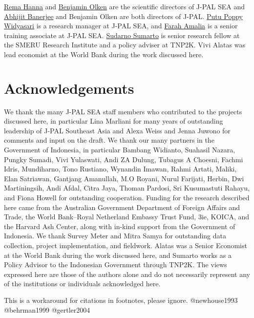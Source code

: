 \href{https://www.hks.harvard.edu/faculty/rema-hanna}{Rema Hanna} and \href{https://economics.mit.edu/faculty/bolken}{Benjamin Olken} are the scientific directors of J-PAL SEA and \href{https://economics.mit.edu/faculty/banerjee}{Abhijit Banerjee} and Benjamin Olken are both directors of J-PAL. \href{https://www.povertyactionlab.org/person/widyasari}{Putu Poppy Widyasari} is a research manager at J-PAL SEA, and \href{https://www.povertyactionlab.org/person/amalia}{Farah Amalia} is a senior training associate at J-PAL SEA. \href{https://www.smeru.or.id/en/content/sudarno-sumarto}{Sudarno Sumarto} is senior research fellow at the SMERU Research Institute and a policy adviser at TNP2K. Vivi Alatas was lead economist at the World Bank during the work discussed here.

\hypertarget{acknowledgements-4}{%
\section*{Acknowledgements}\label{acknowledgements-4}}

We thank the many J-PAL SEA staff members who contributed to the projects discussed here, in particular Lina Marliani for many years of outstanding leadership of J-PAL Southeast Asia and Alexa Weiss and Jenna Juwono for comments and input on the draft. We thank our many partners in the Government of Indonesia, in particular Bambang Widianto, Suahasil Nazara, Pungky Sumadi, Vivi Yulaswati, Andi ZA Dulung, Tubagus A Choesni, Fachmi Idris, Mundiharno, Tono Rustiano, Wynandin Imawan, Rahmi Artati, Maliki, Elan Satriawan, Gantjang Amanullah, M.O Royani, Nurul Farijati, Herbin, Dwi Martiningsih, Andi Afdal, Citra Jaya, Thoman Pardosi, Sri Kusumastuti Rahayu, and Fiona Howell for outstanding cooperation. Funding for the research described here came from the Australian Government Department of Foreign Affairs and Trade, the World Bank--Royal Netherland Embassy Trust Fund, 3ie, KOICA, and the Harvard Ash Center, along with in-kind support from the Government of Indonesia. We thank Survey Meter and Mitra Samya for outstanding data collection, project implementation, and fieldwork. Alatas was a Senior Economist at the World Bank during the work discussed here, and Sumarto works as a Policy Advisor to the Indonesian Government through TNP2K. The views expressed here are those of the authors alone and do not necessarily represent any of the institutions or individuals acknowledged here.

\begin{invisible}
This is a workaround for citations in footnotes, please ignore.
@newhouse1993 @behrman1999 @gertler2004
\end{invisible}

